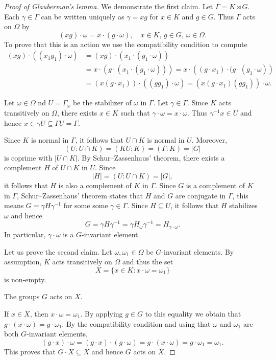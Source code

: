 \begin{proof}[Proof of Glauberman's lemma]
	We demonstrate the first claim. 
	Let $\Gamma=K\rtimes G$. Each $\gamma\in\Gamma$ can be written uniquely as $\gamma=xg$ for
	$x\in K$ and $g\in G$. Thus $\Gamma$ acts on $\Omega$ by
	\[
	(xg)\cdot \omega=x\cdot (g\cdot \omega),\quad x\in K,\,g\in G,\,\omega\in\Omega.
	\]
	To prove that this is an action we use the compatibility condition to compute
	\begin{align*}
	(xg)\cdot ((x_1g_1)\cdot\omega) &= (xg)\cdot \left(x_1\cdot (g_1\cdot\omega)\right)\\
	&=x\cdot \left(g\cdot (x_1\cdot (g_1\cdot\omega))\right)
	=x\cdot \left((g\cdot x_1)\cdot (g\cdot (g_1\cdot\omega)\right)\\
	&=(x(g\cdot x_1))\cdot ((gg_1)\cdot \omega)
	=(x(g\cdot x_1)(gg_1))\cdot\omega.	
	\end{align*}
	
	Let $\omega\in\Omega$ nd $U=\Gamma_\omega$ be the stabilizer of $\omega$ in $\Gamma$. Let $\gamma\in\Gamma$. Since
	$K$ acts transitively on $\Omega$, there exists $x\in K$ such that 
	$\gamma\cdot\omega=x\cdot\omega$. Thus $\gamma^{-1}x\in U$ and
	hence 
	$x\in \gamma U\subseteq \Gamma U=\Gamma$. 
	
	Since $K$ is normal in $\Gamma$, it follows that 
	$U\cap K$ is normal in $U$. Moreover, 
	\[
	(U:U\cap K)=(KU:K)=(\Gamma:K)=|G|
	\]
	is coprime with $|U\cap K|$. By Schur--Zassenhaus' theorem, there exists a complement 
	$H$ of $U\cap K$ in $U$. Since 
	\[
	|H|=(U:U\cap K)=|G|,
	\]
	it follows that $H$ is also a complement of $K$ in $\Gamma$. Since $G$ is a complement of $K$ in $\Gamma$, 
	Schur--Zassenhaus' theorem states that $H$ and $G$ are conjugate in $\Gamma$, this means 
	$G=\gamma H\gamma^{-1}$ for some some $\gamma\in\Gamma$. Since $H\subseteq U$, it follows that $H$ stabilizes $\omega$ and
	hence 
	\[
	G=\gamma H\gamma^{-1}=\gamma H_\omega \gamma^{-1}=H_{\gamma\cdot \omega}.
	\]
	In particular, $\gamma\cdot\omega$ is a $G$-invariant element. 
	
	Let us prove the second claim. 
	Let $\omega,\omega_1\in\Omega$ be $G$-invariant elements. 
	By assumption, $K$ acts transitively on $\Omega$ and thus 
	the set
	\[
	X=\{x\in K:x\cdot \omega=\omega_1\}
	\]
	is non-empty. 
	
	\begin{claim}
		The groups $G$ acts on $X$. 
	\end{claim}

	If $x\in X$, then $x\cdot\omega=\omega_1$. By applying $g\in G$ to this equality we obtain that 
	$g\cdot (x\cdot \omega)=g\cdot\omega_1$. By the compatibility condition and using that
	$\omega$ and $\omega_1$ are both $G$-invariant elements, 
	\[
	(g\cdot x)\cdot \omega=(g\cdot x)\cdot (g\cdot\omega)= g\cdot (x\cdot \omega)=g\cdot\omega_1=\omega_1.
	\]
	This proves that $G\cdot X\subseteq X$ and hence $G$ acts on $X$. 
	

\end{proof}
